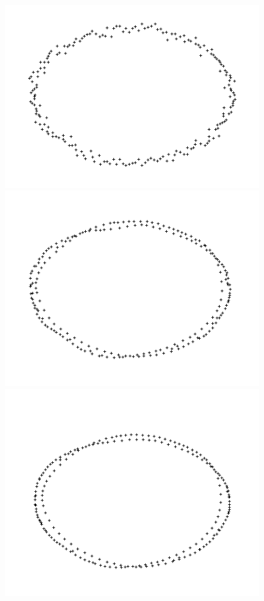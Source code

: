 \documentclass{beamer}
\begin{document}
\begin{frame}[allowframebreaks]
    \begin{figure}
        \centering
        \includegraphics[scale=0.18]{img/ellipse-perimeter-dense-0}
        \includegraphics[scale=0.18]{img/ellipse-perimeter-dense-10}
        \includegraphics[scale=0.18]{img/ellipse-perimeter-dense-50}

\end{figure}
\end{frame}
\end{document}
